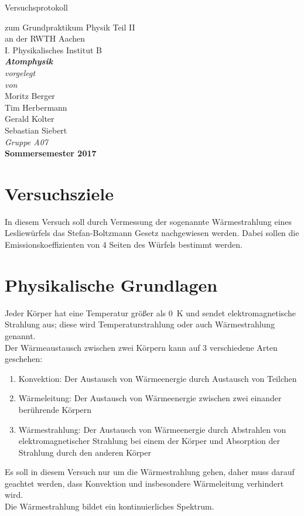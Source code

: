 \documentclass[12pt,a4paper]{article}
\author{Tim}
\begin{document}
	\setlength{\parindent}{0pt} 
	\begin{center}
		{\LARGE Versuchsprotokoll}\\
		\begin{large}
			zum Grundpraktikum Physik Teil II\\[0.4cm]
			an der RWTH Aachen\\
			I. Physikalisches Institut B\\[4.5cm]
			\Large\textbf{\textsl{Atomphysik}}\\[4cm]
			\normalsize\textit{vorgelegt\\von}\\[0.4cm]
			\large{Moritz Berger\\Tim Herbermann\\Gerald Kolter\\Sebastian Siebert}\\[1cm]
			\large \textit{Gruppe A07} \\ [3cm]
			\large \textbf{Sommersemester 2017}
		\end{large}
	\end{center}
	\newpage
	
\tableofcontents
\newpage

\section{Versuchsziele}
In diesem Versuch soll durch Vermessung der sogenannte Wärmestrahlung eines Lesliewürfels das Stefan-Boltzmann Gesetz nachgewiesen werden. Dabei sollen die Emissionskoeffizienten von 4 Seiten des Würfels bestimmt werden.

\section{Physikalische Grundlagen}
Jeder Körper hat eine Temperatur größer als \SI{0}{K} und sendet elektromagnetische Strahlung aus; diese wird Temperaturstrahlung oder auch Wärmestrahlung genannt. \\
Der Wärmeaustausch zwischen zwei Körpern kann auf 3 verschiedene Arten geschehen:
\begin{enumerate}
\item Konvektion: Der Austausch von Wärmeenergie durch Austausch von Teilchen
\item Wärmeleitung: Der Austausch von Wärmeenergie zwischen zwei einander berührende Körpern
\item Wärmestrahlung: Der Austausch von Wärmeenergie durch Abstrahlen von elektromagnetischer Strahlung bei einem der Körper und Absorption der Strahlung durch den anderen Körper
\end{enumerate}
Es soll in diesem Versuch nur um die Wärmestrahlung gehen, daher muss darauf geachtet werden, dass Konvektion und insbesondere Wärmeleitung verhindert wird. \\
Die Wärmestrahlung bildet ein kontinuierliches Spektrum. 
\end{document}
